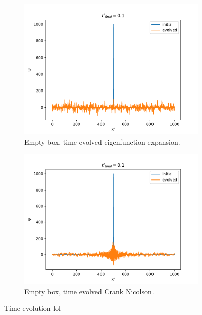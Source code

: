 \documentclass{article}
\begin{document}
\begin{figure}[H]
\begin{subfigure}[b]{0.5\textwidth}
        \includegraphics[width=\linewidth]{./media/time_evolve_emptybox_2.pdf}
        \caption{Empty box, time evolved eigenfunction expansion.}
        \label{fig:box-time-evolved2}
    \end{subfigure}
    \begin{subfigure}[b]{0.5\textwidth}
        \includegraphics[width=\linewidth]{./media/time_evolve_emptybox_2_cn.pdf}
        \caption{Empty box, time evolved Crank Nicolson.}
        \label{fig:box-time-evolved2_cn}
    \end{subfigure}
    \caption{Time evolution lol}
\end{figure}
\end{document}
